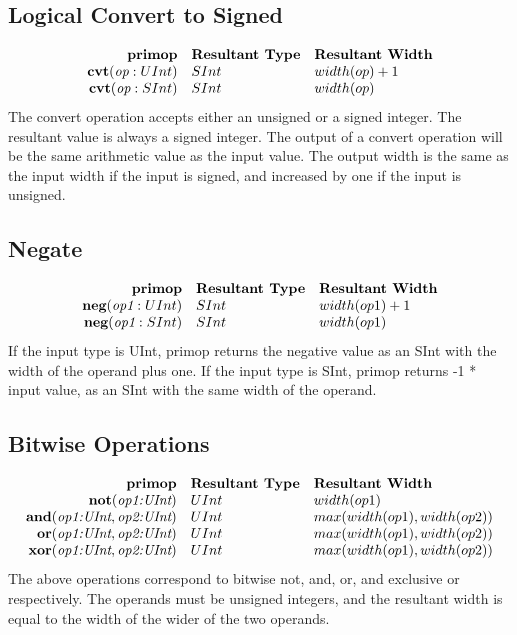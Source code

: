 \documentclass[12pt]{article}
\begin{document}
\subsection{Logical Convert to Signed}
\[
\begin{array}{rll}
\text{\bf primop} & \text{\bf Resultant Type} & \text{\bf Resultant Width} \\
\text{\bf cvt}(\text{\em op}:UInt)      & SInt & width(op) + 1 \\
\text{\bf cvt}(\text{\em op}:SInt)      & SInt & width(op) \\
\end{array}
\]
The convert operation accepts either an unsigned or a signed integer.
The resultant value is always a signed integer.
The output of a convert operation will be the same arithmetic value as the input value.
The output width is the same as the input width if the input is signed, and increased by one if the input is unsigned.

\subsection{Negate}
\[
\begin{array}{rll}
\text{\bf primop} & \text{\bf Resultant Type} & \text{\bf Resultant Width} \\
\text{\bf neg}(\text{\em op1}:UInt)       & SInt & width(op1) + 1 \\
\text{\bf neg}(\text{\em op1}:SInt)       & SInt & width(op1) \\
\end{array}
\]
If the input type is UInt, primop returns the negative value as an SInt with the width of the operand plus one.
If the input type is SInt, primop returns -1 * input value, as an SInt with the same width of the operand.

\subsection{Bitwise Operations}
\[
\begin{array}{rll}
\text{\bf primop} & \text{\bf Resultant Type} & \text{\bf Resultant Width} \\
\text{\bf not}     (\text{\em op1:UInt}) & UInt & width(op1)    \\
\text{\bf and}     (\text{\em op1:UInt}, \text{\em op2:UInt}) & UInt & max(width(op1),width(op2))    \\
\text{\bf or}      (\text{\em op1:UInt}, \text{\em op2:UInt}) & UInt & max(width(op1),width(op2))    \\
\text{\bf xor}     (\text{\em op1:UInt}, \text{\em op2:UInt}) & UInt & max(width(op1),width(op2))    \\
\end{array}
\]
The above operations correspond to bitwise not, and, or, and exclusive or respectively.
The operands must be unsigned integers, and the resultant width is equal to the width of the wider of the two operands. 
\end{document}
